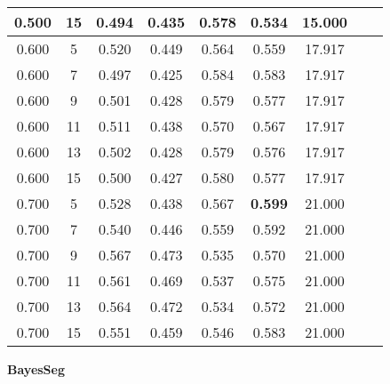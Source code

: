 \documentclass{article}
\begin{document}
\begin{longtable}[c]{|c|c|c|c|c|c|c|c|c|}
 0.500 & 15 & 0.494 & 0.435 & 0.578 & 0.534 & 15.000  \\ \hline 
 0.600 & 5 & 0.520 & 0.449 & 0.564 & 0.559 & 17.917  \\ \hline 
 0.600 & 7 & 0.497 & 0.425 & 0.584 & 0.583 & 17.917  \\ \hline 
 0.600 & 9 & 0.501 & 0.428 & 0.579 & 0.577 & 17.917  \\ \hline 
 0.600 & 11 & 0.511 & 0.438 & 0.570 & 0.567 & 17.917  \\ \hline 
 0.600 & 13 & 0.502 & 0.428 & 0.579 & 0.576 & 17.917  \\ \hline 
 0.600 & 15 & 0.500 & 0.427 & 0.580 & 0.577 & 17.917  \\ \hline 
 0.700 & 5 & 0.528 & 0.438 & 0.567 & \cellcolor{gray!20} \textbf{0.599} & 21.000  \\ \hline 
 0.700 & 7 & 0.540 & 0.446 & 0.559 & 0.592 & 21.000  \\ \hline 
 0.700 & 9 & 0.567 & 0.473 & 0.535 & 0.570 & 21.000  \\ \hline 
 0.700 & 11 & 0.561 & 0.469 & 0.537 & 0.575 & 21.000  \\ \hline 
 0.700 & 13 & 0.564 & 0.472 & 0.534 & 0.572 & 21.000  \\ \hline 
 0.700 & 15 & 0.551 & 0.459 & 0.546 & 0.583 & 21.000  \\ \hline 
 \end{longtable} 

\newpage

{  
\large
\center
	\textbf{BayesSeg}  

}
\end{document}

